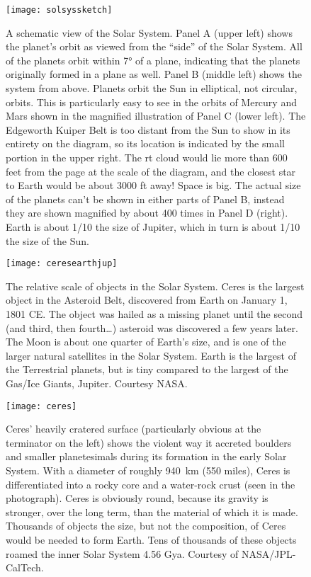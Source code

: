 \documentclass[amstex,12pt]{book}
\begin{document}
\begin{figure}[p]
\centering
\texttt{[image: solsyssketch]}%
\caption{A schematic view of the Solar System. Panel A (upper left) shows the planet’s orbit as viewed from the ``side'' of the Solar System. All of the planets orbit within \ang{7} of a plane, indicating that the planets originally formed in a plane as well. Panel B (middle left) shows the system from above. Planets orbit the Sun in elliptical, not circular, orbits. This is particularly easy to see in the orbits of Mercury and Mars shown in the magnified illustration of Panel C (lower left). The Edgeworth Kuiper Belt is too distant from the Sun to show in its entirety on the diagram, so its location is indicated by the small portion in the upper right. The rt cloud would lie more than 600 feet from the page at the scale of the diagram, and the closest star to Earth would be about 3000 ft away! Space is big. The actual size of the planets can't be shown in either parts of Panel B, instead they are shown magnified by about 400 times in Panel D (right). Earth is about 1/10 the size of Jupiter, which in turn is about 1/10 the size of the Sun.}   
\label{fig:solsys2}
\end{figure}
 
\begin{figure}[p]
\centering
\texttt{[image: ceresearthjup]}%
\caption{The relative scale of objects in the Solar System. Ceres is the largest object in the Asteroid Belt, discovered from Earth on January 1, 1801 CE. The object was hailed as a missing planet until the second (and third, then fourth…) asteroid was discovered a few years later. The Moon is about one quarter of Earth’s size, and is one of the larger natural satellites in the Solar System. Earth is the largest of the Terrestrial planets, but is tiny compared to the largest of the Gas/Ice Giants, Jupiter. Courtesy NASA.}   
\label{fig:sizes}
\end{figure}

\begin{figure}[p]
\centering
\texttt{[image: ceres]}%
\caption{Ceres' heavily cratered surface (particularly obvious at the terminator on the left) shows the violent way it accreted boulders and smaller planetesimals during its formation in the early Solar System. With a diameter of roughly \SI{940}{\kilo\metre} (550 miles), Ceres is differentiated into a rocky core and a water-rock crust (seen in the photograph). Ceres is obviously round, because its gravity is stronger, over the long term, than the material of which it is made. Thousands of objects the size, but not the composition, of Ceres would be needed to form Earth. Tens of thousands of these objects roamed the inner Solar System 4.56 Gya. Courtesy of NASA/JPL-CalTech.}   
\label{fig:ceres}
\end{figure}
\end{document}
